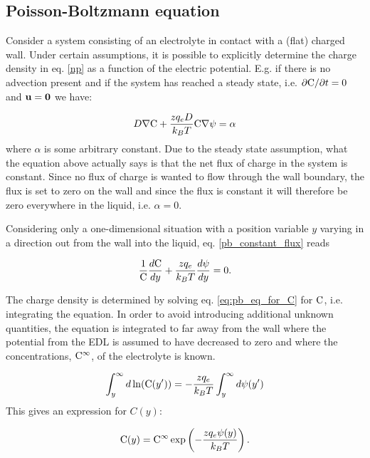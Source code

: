 \subsection{Poisson-Boltzmann equation}\label{sec:et:pb}
Consider a system consisting of an electrolyte in contact with a
(flat) charged wall.  Under certain assumptions, it is possible to
explicitly determine the charge density in eq. \eqref{np} as a
function of the electric potential. E.g. if there is no advection
present and if the system has reached a steady state, i.e. $\partial
\mathrm{C} /\partial t = 0$ and $\mathbf{u} = \mathbf{0}$ we have:

\begin{equation}\label{pb_constant_flux}
D\nabla \mathrm{C} + \frac{zq_eD}{k_BT}\mathrm{C}\nabla\mathrm{\psi} = \alpha
\end{equation} 
where $\alpha$ is some arbitrary constant. Due to the steady state
assumption, what the equation above actually says is that the net flux
of charge in the system is constant. Since no flux of charge is wanted
to flow through the wall boundary, the flux is set to zero on the wall
and since the flux is constant it will therefore be zero everywhere in
the liquid, i.e. $\alpha = 0$.

Considering only a one-dimensional situation with a position variable
$y$ varying in a direction out from the wall into the liquid,
eq. \eqref{pb_constant_flux} reads

\begin{equation}\label{eq:pb_eq_for_C}
\frac{1}{\mathrm{C}} \dfrac{d \mathrm{C}}{d y} + \frac{zq_e}{k_BT} \dfrac{d \mathrm{\psi}}{d
  y} = 0.
\end{equation}

The charge density is determined by solving eq. \eqref{eq:pb_eq_for_C}
for $\mathrm{C}$, i.e. integrating the equation. In order to avoid introducing
additional unknown quantities, the equation is integrated to far away
from the wall where the potential from the EDL is assumed to have
decreased to zero and where the concentrations, $\mathrm{C}^{\infty}$, of the
electrolyte is known.

\begin{equation}
\int_y^{\infty} d\ln( \mathrm{C}(y')) = -\frac{z q_e}{k_BT}\int_y^{\infty}d\mathrm{\psi}(y')
\end{equation}
This gives an expression for $C(y)$:

\begin{equation}\label{eq:C}
\mathrm{C}(y) = \mathrm{C}^{\infty} \exp\left(-\frac{z q_e \mathrm{\psi}(y)}{k_BT}\right).
\end{equation}

